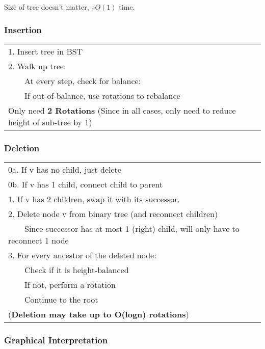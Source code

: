 \documentclass{article}
\newcommand{\tabitem}{~~\llap{\textbullet}~~}
\begin{document}
    \bigskip

    Size of tree doesn't matter, $\therefore O(1)$ time.
    
    \subsubsection{Insertion}

    \begin{tabular}{l}
        1. Insert tree in BST \\
        2. Walk up tree:\\
        \tabitem At every step, check for balance:\\
        \tabitem If out-of-balance, use rotations to rebalance\\    
        Only need \textbf{2 Rotations} (Since in all cases, only need to reduce height of sub-tree by 1)\\  
    \end{tabular}
    

    \subsubsection{Deletion}

    \begin{tabular}{l}
        0a. If v has no child, just delete \\
        0b. If v has 1 child, connect child to parent\\
        1. If v has 2 children, swap it with its successor.\\
        2. Delete node v from binary tree (and reconnect children)\\
        \tabitem Since successor has at most 1 (right) child, will only have to reconnect 1 node\\
        3. For every ancestor of the deleted node:\\
        \tabitem Check if it is height-balanced\\
        \tabitem If not, perform a rotation\\
        \tabitem Continue to the root\\
        (\textbf{Deletion may take up to O(logn) rotations})\\        
    \end{tabular}


    \pagebreak
    
    \subsubsection{Graphical Interpretation}
\end{document}
